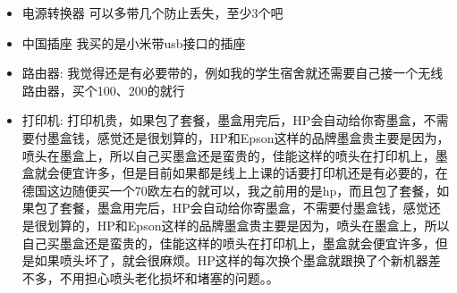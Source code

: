 \documentclass[doku]{subfiles}
\begin{document}
\begin{itemize}
	\item 电源转换器  可以多带几个防止丢失，至少3个吧
	\item 中国插座 我买的是小米带usb接口的插座
	\item 路由器: 我觉得还是有必要带的，例如我的学生宿舍就还需要自己接一个无线路由器，买个100、200的就行
	\item 打印机: 打印机贵，如果包了套餐，墨盒用完后，HP会自动给你寄墨盒，不需要付墨盒钱，感觉还是很划算的，HP和Epson这样的品牌墨盒贵主要是因为，喷头在墨盒上，所以自己买墨盒还是蛮贵的，佳能这样的喷头在打印机上，墨盒就会便宜许多，但是目前如果都是线上上课的话要打印机还是有必要的，在德国这边随便买一个70欧左右的就可以，我之前用的是hp，而且包了套餐，如果包了套餐，墨盒用完后，HP会自动给你寄墨盒，不需要付墨盒钱，感觉还是很划算的，HP和Epson这样的品牌墨盒贵主要是因为，喷头在墨盒上，所以自己买墨盒还是蛮贵的，佳能这样的喷头在打印机上，墨盒就会便宜许多，但是如果喷头坏了，就会很麻烦。HP这样的每次换个墨盒就跟换了个新机器差不多，不用担心喷头老化损坏和堵塞的问题。。
	
\end{itemize}
\end{document}
